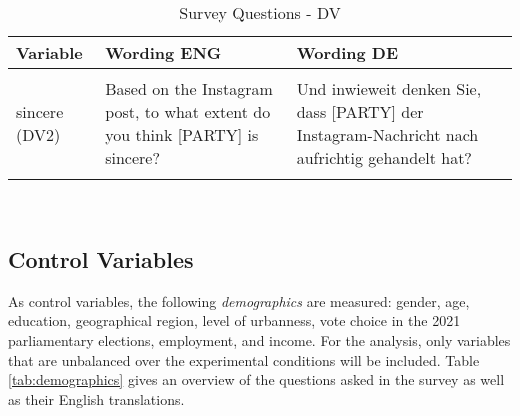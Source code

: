 \documentclass[]{article}
\begin{document}
\begin{table}[!h]

\caption{\label{tab:dv}\label{tab:dv}Survey Questions - DV}
\centering
\begin{tabular}[t]{>{\raggedright\arraybackslash}p{3cm}>{\raggedright\arraybackslash}p{7cm}>{\raggedright\arraybackslash}p{7cm}}
\toprule
Variable & Wording ENG & Wording DE\\
\midrule
\cellcolor{gray!6}{trust (DV1)} & \cellcolor{gray!6}{Based on the Instagram post, to what extent do you trust [PARTY]} & \cellcolor{gray!6}{Der Instagram-Nachricht nach zu urteilen, wie sehr würden Sie [PARTY] vertrauen?}\\
sincere (DV2) & Based on the Instagram post, to what extent do you think [PARTY] is sincere? & Und inwieweit denken Sie, dass [PARTY] der Instagram-Nachricht nach aufrichtig gehandelt hat?\\
\cellcolor{gray!6}{representation (DV3)} & \cellcolor{gray!6}{Based on the Instagram post, to what extent do you think [PARTY] does a good job in representing its voters?} & \cellcolor{gray!6}{Und inwiefern denken Sie, dass [PARTY] ihre Wähler gut vertritt in Anbetracht der Instagram-Nachricht?}\\
\bottomrule
\end{tabular}
\end{table}

~

\hypertarget{control-variables}{%
\subsection{Control Variables}\label{control-variables}}

As control variables, the following \emph{demographics} are measured:
gender, age, education, geographical region, level of urbanness, vote
choice in the 2021 parliamentary elections, employment, and income. For
the analysis, only variables that are unbalanced over the experimental
conditions will be included. Table \ref{tab:demographics} gives an
overview of the questions asked in the survey as well as their English
translations.
\end{document}

